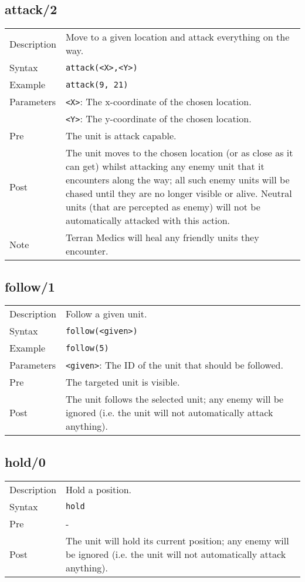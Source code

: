 \subsection{attack/2}
\begin{tabularx}{\textwidth}{lX}
 Description & Move to a given location and attack everything on the way. \\
 Syntax & \verb|attack(<X>,<Y>)| \\
 Example & \verb|attack(9, 21)| \\
 Parameters & \verb|<X>|: The x-coordinate of the chosen location. \\
            & \verb|<Y>|: The y-coordinate of the chosen location. \\
 Pre & The unit is attack capable. \\
 Post & The unit moves to the chosen location (or as close as it can get) whilst attacking any enemy unit that it encounters along the way; all such enemy units will be chased until they are no longer visible or alive. Neutral units (that are percepted as enemy) will not be automatically attacked with this action. \\
 Note & Terran Medics will heal any friendly units they encounter.
\end{tabularx}

\subsection{follow/1}
\begin{tabularx}{\textwidth}{lX}
 Description & Follow a given unit. \\
 Syntax & \verb|follow(<given>)| \\
 Example & \verb|follow(5)| \\
 Parameters & \verb|<given>|: The ID of the unit that should be followed. \\
 Pre & The targeted unit is visible. \\
 Post & The unit follows the selected unit; any enemy will be ignored (i.e. the unit will not automatically attack anything).
\end{tabularx}

\subsection{hold/0}
\begin{tabularx}{\textwidth}{lX}
 Description & Hold a position. \\
 Syntax & \verb|hold| \\
 Pre & - \\
 Post & The unit will hold its current position; any enemy will be ignored (i.e. the unit will not automatically attack anything). 
\end{tabularx}

